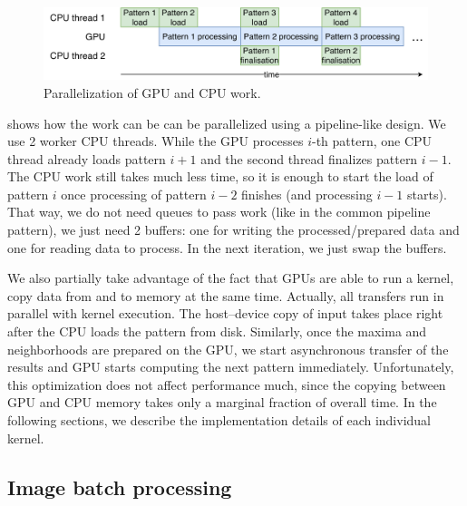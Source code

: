\begin{figure}
	\centering
	\includegraphics[width=\textwidth]{img/CPUGPUparal}
	\caption{Parallelization of GPU and CPU work.}
	\label{pipeline}
\end{figure}

 shows how the work can be can be parallelized using a pipeline-like design. We use 2 worker CPU threads. While the GPU processes $i$-th pattern, one CPU thread already loads pattern $i+1$ and the second thread finalizes pattern $i-1$. The CPU work still takes much less time, so it is enough to start the load of pattern $i$ once processing of pattern $i-2$ finishes (and processing $i-1$ starts). That way, we do not need queues to pass work (like in the common pipeline pattern), we just need 2 buffers: one for writing the processed/prepared data and one for reading data to process. In the next iteration, we just swap the buffers.

We also partially take advantage of the fact that GPUs are able to run a kernel, copy data from and to memory at the same time. Actually, all transfers run in parallel with kernel execution. The host--device copy of input takes place right after the CPU loads the pattern from disk. Similarly, once the maxima and neighborhoods are prepared on the GPU, we start asynchronous transfer of the results and GPU starts computing the next pattern immediately. Unfortunately, this optimization does not affect performance much, since the copying between GPU and CPU memory takes only a marginal fraction of overall time.
In the following sections, we describe the implementation details of each individual kernel.


\subsection{Image batch processing}
\label{batch-param}


